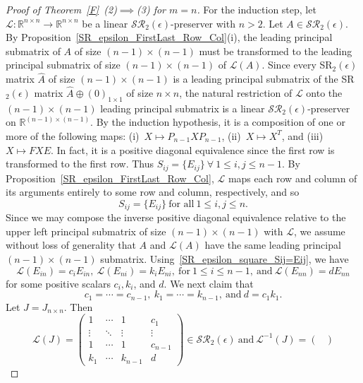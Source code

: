 \documentclass[11pt,reqno]{amsart}
\theoremstyle{plain}
\theoremstyle{definition}
\numberwithin{equation}{section}
\begin{document}
\begin{proof}[Proof of Theorem~\ref{F}~(2)$\implies$(3) for $m=n$]
	For the induction step, let $\mathcal{L}:\mathbb{R}^{n\times n} \to\mathbb{R}^{n\times n}$ be a linear $\mathcal{SR}_2(\epsilon)$-preserver with $n>2$. Let $A\in\mathcal{SR}_2(\epsilon)$. By Proposition~\ref{SR_epsilon_FirstLast_Row_Col}(i), the leading principal submatrix of $A$ of size $(n-1)\times (n-1)$ must be transformed to the leading principal submatrix of size $(n-1)\times (n-1)$ of $\mathcal{L}(A)$. Since every SR$_2(\epsilon)$ matrix $\widehat{A}$ of size
	$(n-1)\times(n-1)$ is a leading principal submatrix of the SR$_2(\epsilon)$ matrix $\widehat{A}\oplus(0)_{1\times1}$ of size $n\times n$, the natural restriction of $\mathcal{L}$ onto the $(n-1)\times(n-1)$ leading
	principal submatrix is a linear $\mathcal{SR}_2(\epsilon)$-preserver on
	$\mathbb{R}^{(n-1)\times(n-1)}$. By the induction hypothesis, it is a composition of one or more of the following maps: (i)~$X\mapsto P_{n-1}XP_{n-1}$, (ii)~$X\mapsto X^T$, and (iii)~$X\mapsto FXE$. In fact, it is a positive diagonal equivalence since the first row is transformed to the first row. Thus $S_{ij}=\{E_{ij}\}\ \forall~1\leq i,j\leq
	n-1.$ By Proposition~\ref{SR_epsilon_FirstLast_Row_Col}, $\mathcal{L}$ maps each row and column of its arguments entirely to some row and column, respectively, and so
	\begin{equation}\label{SR_epsilon_square_Sij=Eij}
		S_{ij}=\{E_{ij}\}~\text{for all} ~ 1\leq i,j\leq n.
	\end{equation}
	Since we may compose the inverse positive diagonal equivalence relative to the upper left principal submatrix of size $(n-1)\times(n-1)$ with $\mathcal{L}$, we assume without loss of generality that $A$ and $\mathcal{L}(A)$ have the same leading principal $(n-1) \times (n-1)$ submatrix. Using~\eqref{SR_epsilon_square_Sij=Eij}, we have
	\[\mathcal{L}(E_{in})=c_iE_{in}, ~ \mathcal{L}(E_{ni})=k_iE_{ni}, ~\text{for}~ 1\leq i\leq n-1, ~\text{and}~
	\mathcal{L}(E_{nn})=dE_{nn}\] 
	for some positive scalars $c_i,k_i$, and $d$. We next claim that
	\begin{equation}\label{eqthrmE3}
		c_1=\cdots=c_{n-1}, ~k_1=\cdots=k_{n-1},~\text{and}~d=c_1k_1.
	\end{equation}
	Let $J=J_{n\times n}$. Then
	\[\mathcal{L}(J)=\begin{pmatrix}
		1 & \cdots & 1 & c_1 \\
		\vdots & \ddots & \vdots & \vdots \\
		1 & \cdots & 1 & c_{n-1} \\
		k_1 & \cdots & k_{n-1} & d
	\end{pmatrix}\in \mathcal{SR}_2(\epsilon) ~\text{and}~\mathcal{L}^{-1}(J)=\begin{pmatrix}

\end{pmatrix}\]
\end{proof}
\end{document}
